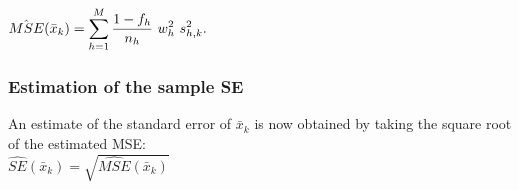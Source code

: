 $
    \hat{MSE} (\bar{x}_k )
    = \displaystyle\sum^M_{h=1} \dfrac{1 - f_h}{n_h} \ w^2_h\ s^2_{h,k}.
$
\hfill \cite{statistics/book/Statistics-for-Data-Scientists/Maurits-Kaptein}


\subsubsection{Estimation of the sample SE}

An estimate of the standard error of $\bar{x}_k$ is now obtained by taking the square root of
the estimated MSE:
\hfill \cite{statistics/book/Statistics-for-Data-Scientists/Maurits-Kaptein}
\\
$
    \hat{SE}(\bar{x}_k) = \sqrt{\hat{MSE} (\bar{x}_k )}
$












